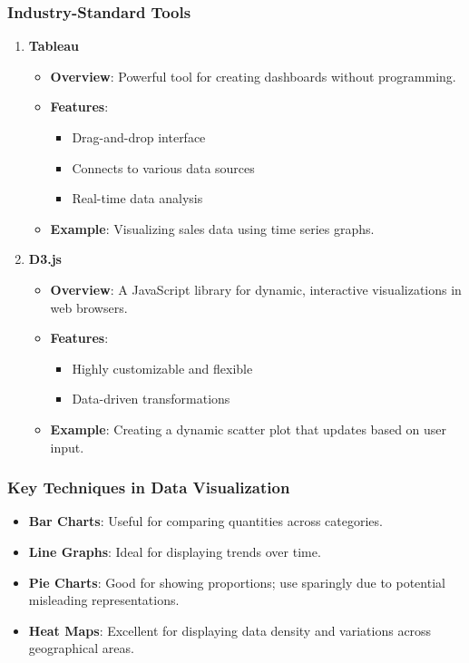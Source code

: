 \documentclass{beamer}
\begin{document}
\begin{frame}[fragile]
    \frametitle{Industry-Standard Tools}
    \begin{enumerate}
        \item \textbf{Tableau}
        \begin{itemize}
            \item \textbf{Overview}: Powerful tool for creating dashboards without programming.
            \item \textbf{Features}:
            \begin{itemize}
                \item Drag-and-drop interface
                \item Connects to various data sources
                \item Real-time data analysis
            \end{itemize}
            \item \textbf{Example}: Visualizing sales data using time series graphs.
        \end{itemize}
        
        \item \textbf{D3.js}
        \begin{itemize}
            \item \textbf{Overview}: A JavaScript library for dynamic, interactive visualizations in web browsers.
            \item \textbf{Features}:
            \begin{itemize}
                \item Highly customizable and flexible
                \item Data-driven transformations
            \end{itemize}
            \item \textbf{Example}: Creating a dynamic scatter plot that updates based on user input.
        \end{itemize}
    \end{enumerate}
\end{frame}

\begin{frame}[fragile]
    \frametitle{Key Techniques in Data Visualization}
    \begin{itemize}
        \item \textbf{Bar Charts}: Useful for comparing quantities across categories.
        \item \textbf{Line Graphs}: Ideal for displaying trends over time.
        \item \textbf{Pie Charts}: Good for showing proportions; use sparingly due to potential misleading representations.
        \item \textbf{Heat Maps}: Excellent for displaying data density and variations across geographical areas.
    \end{itemize}
\end{frame}
\end{document}
